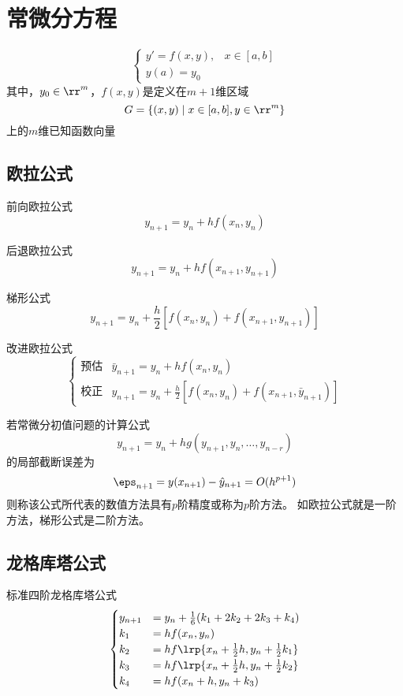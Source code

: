
\section{常微分方程}
\[\begin{cases}
    y'=f(x,y),&x\in[a,b]\\
    y(a)=y_0
\end{cases}\]
其中，$y_0\in\rr^m$，$f(x,y)$是定义在$m+1$维区域
\[G=\{(x,y)\mid x\in[a,b],y\in\rr^m\}\]
上的$m$维已知函数向量

\subsection{欧拉公式}
前向欧拉公式
\[y_{n+1}=y_n+hf(x_n,y_n)\]

后退欧拉公式
\[y_{n+1}=y_n+hf(x_{n+1},y_{n+1})\]

梯形公式
\[y_{n+1}=y_n+\frac{h}{2}[f(x_n,y_n)+f(x_{n+1},y_{n+1})]\]

改进欧拉公式
\[\begin{cases}
    \text{预估} & \bar{y}_{n+1}=y_n+hf(x_n,y_n)\\
    \text{校正} & y_{n+1}=y_n+\frac{h}{2}[f(x_n,y_n)+f(x_{n+1},\bar{y}_{n+1})]
\end{cases}\]

\begin{theorem}
若常微分初值问题的计算公式
\[y_{n+1}=y_n+hg(y_{n+1},y_n,\ldots,y_{n-r})\]
的局部截断误差为
\[\eps_{n+1}=y(x_{n+1})-\hat{y}_{n+1}=O(h^{p+1})\]
则称该公式所代表的数值方法具有$p$阶精度或称为$p$阶方法。
如欧拉公式就是一阶方法，梯形公式是二阶方法。
\end{theorem}

\subsection{龙格库塔公式}
标准四阶龙格库塔公式
\[\begin{cases}
    y_{n+1}&=y_n+\frac{1}{6}(k_1+2k_2+2k_3+k_4)\\
    k_1&=hf(x_n,y_n)\\
    k_2&=hf\lrp{x_n+\frac{1}{2}h,y_n+\frac{1}{2}k_1}\\
    k_3&=hf\lrp{x_n+\frac{1}{2}h,y_n+\frac{1}{2}k_2}\\
    k_4&=hf(x_n+h,y_n+k_3)
\end{cases}\]